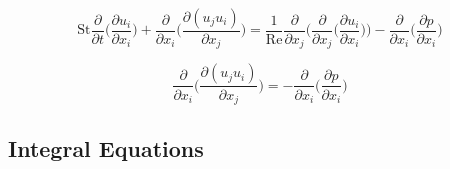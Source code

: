 \documentclass[10pt, letterpaper]{article}
\begin{document}
\begin{equation}
  \text{St}\frac{\partial}{\partial{t}}\bigg(\frac{\partial{u_{i}}}{\partial{x_{i}}}\bigg) + \frac{\partial}{\partial{x_{i}}}\bigg(\frac{\partial{(u_{j}u_{i})}}{\partial{x_{j}}}\bigg) = \frac{1}{\text{Re}}\frac{\partial}{\partial{x_{j}}}\bigg(\frac{\partial}{\partial{x_{j}}}\bigg(\frac{\partial{u_{i}}}{\partial{x_{i}}}\bigg)\bigg) -\frac{\partial}{\partial{x_{i}}}\bigg(\frac{\partial{p}}{\partial{x_{i}}}\bigg)
  \label{eq:mom_ndim_div_simp}
\end{equation}

\begin{equation}
  \boxed{
    \frac{\partial}{\partial{x_{i}}}\bigg(\frac{\partial(u_{j}u_{i})}{\partial{x_{j}}}\bigg) = - \frac{\partial}{\partial{x_{i}}}\bigg(\frac{\partial{p}}{\partial{x_{i}}}\bigg)
  }
  \label{eq:press_poiss}
\end{equation}


\subsection{Integral Equations}

\printbibliography{}
\end{document}

